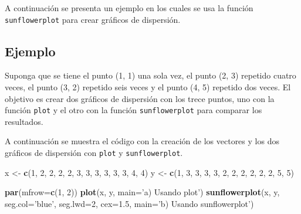 \documentclass[10pt,]{krantz}
\makeatletter
\newenvironment{Shaded}{\begin{snugshade}}{\end{snugshade}}
\newcommand{\KeywordTok}[1]{\textcolor[rgb]{0.13,0.29,0.53}{\textbf{#1}}}
\newcommand{\DataTypeTok}[1]{\textcolor[rgb]{0.13,0.29,0.53}{#1}}
\newcommand{\DecValTok}[1]{\textcolor[rgb]{0.00,0.00,0.81}{#1}}
\newcommand{\FloatTok}[1]{\textcolor[rgb]{0.00,0.00,0.81}{#1}}
\newcommand{\StringTok}[1]{\textcolor[rgb]{0.31,0.60,0.02}{#1}}
\newcommand{\NormalTok}[1]{#1}
\newenvironment{kframe}{%
\medskip{}
\setlength{\fboxsep}{.8em}
 \def\at@end@of@kframe{}%
 \ifinner\ifhmode%
  \def\at@end@of@kframe{\end{minipage}}%
  \begin{minipage}{\columnwidth}%
 \fi\fi%
 \def\FrameCommand##1{\hskip\@totalleftmargin \hskip-\fboxsep
 \colorbox{shadecolor}{##1}\hskip-\fboxsep
     \hskip-\linewidth \hskip-\@totalleftmargin \hskip\columnwidth}%
 \MakeFramed {\advance\hsize-\width
   \@totalleftmargin\z@ \linewidth\hsize
   \@setminipage}}%
 {\par\unskip\endMakeFramed%
 \at@end@of@kframe}
\renewenvironment{Shaded}{\begin{kframe}}{\end{kframe}}
\makeatother
\begin{document}
A continuación se presenta un ejemplo en los cuales se usa la función
\texttt{sunflowerplot} para crear gráficos de dispersión.

\subsection*{Ejemplo}\label{ejemplo-11}


Suponga que se tiene el punto (1, 1) una sola vez, el punto (2, 3)
repetido cuatro veces, el punto (3, 2) repetido seis veces y el punto
(4, 5) repetido dos veces. El objetivo es crear dos gráficos de
dispersión con los trece puntos, uno con la función \texttt{plot} y el
otro con la función \texttt{sunflowerplot} para comparar los resultados.

A continuación se muestra el código con la creación de los vectores y
los dos gráficos de dispersión con \texttt{plot} y
\texttt{sunflowerplot}.

\begin{Shaded}
\begin{Highlighting}[]
\NormalTok{x <-}\StringTok{ }\KeywordTok{c}\NormalTok{(}\DecValTok{1}\NormalTok{, }\DecValTok{2}\NormalTok{, }\DecValTok{2}\NormalTok{, }\DecValTok{2}\NormalTok{, }\DecValTok{2}\NormalTok{, }\DecValTok{3}\NormalTok{, }\DecValTok{3}\NormalTok{, }\DecValTok{3}\NormalTok{, }\DecValTok{3}\NormalTok{, }\DecValTok{3}\NormalTok{, }\DecValTok{3}\NormalTok{, }\DecValTok{4}\NormalTok{, }\DecValTok{4}\NormalTok{)}
\NormalTok{y <-}\StringTok{ }\KeywordTok{c}\NormalTok{(}\DecValTok{1}\NormalTok{, }\DecValTok{3}\NormalTok{, }\DecValTok{3}\NormalTok{, }\DecValTok{3}\NormalTok{, }\DecValTok{3}\NormalTok{, }\DecValTok{2}\NormalTok{, }\DecValTok{2}\NormalTok{, }\DecValTok{2}\NormalTok{, }\DecValTok{2}\NormalTok{, }\DecValTok{2}\NormalTok{, }\DecValTok{2}\NormalTok{, }\DecValTok{5}\NormalTok{, }\DecValTok{5}\NormalTok{)}

\KeywordTok{par}\NormalTok{(}\DataTypeTok{mfrow=}\KeywordTok{c}\NormalTok{(}\DecValTok{1}\NormalTok{, }\DecValTok{2}\NormalTok{))}
\KeywordTok{plot}\NormalTok{(x, y, }\DataTypeTok{main=}\StringTok{'a) Usando plot'}\NormalTok{)}
\KeywordTok{sunflowerplot}\NormalTok{(x, y, }\DataTypeTok{seg.col=}\StringTok{'blue'}\NormalTok{, }\DataTypeTok{seg.lwd=}\DecValTok{2}\NormalTok{, }\DataTypeTok{cex=}\FloatTok{1.5}\NormalTok{,}
              \DataTypeTok{main=}\StringTok{'b) Usando sunflowerplot'}\NormalTok{)}
\end{Highlighting}
\end{Shaded}
\end{document}
